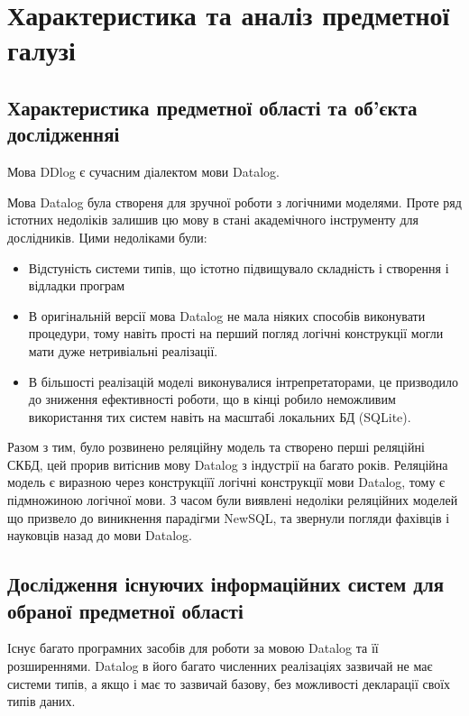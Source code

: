 \chapter{Характеристика та аналіз предметної галузі} 
\label{chap:first}

\section{Характеристика предметної області та об’єкта дослідженняі}

Мова DDlog є сучасним діалектом мови Datalog.

Мова Datalog була створеня для зручної роботи з логічними моделями. Проте ряд істотних недоліків залишив цю мову в стані академічного інструменту для дослідників. Цими недоліками були:
\begin{itemize}

\item Відстуність системи типів, що істотно підвищувало складність і створення і відладки програм

\item В оригінальній версії мова Datalog не мала ніяких способів виконувати процедури, тому навіть прості на перший погляд логічні конструкції могли мати дуже нетривіальні реалізації.

\item В більшості реалізацій моделі виконувалися інтрепретаторами, це призводило до зниження ефективності роботи, що в кінці робило неможливим використання тих систем навіть на масштабі локальних БД (SQLite).

\end{itemize}

Разом з тим, було розвинено реляційну модель та створено перші реляційні СКБД, цей прорив витіснив мову Datalog з індустрії на багато років. Реляційна модель є виразною  через конструкціїї логічні конструкції мови Datalog, тому є підмножиною логічної мови. З часом були виявлені недоліки реляційних моделей що призвело до виникнення парадігми NewSQL, та звернули погляди фахівців і науковців назад до мови Datalog.

\section{Дослідження існуючих інформаційних систем для обраної предметної області}

Існує багато програмних засобів для роботи за мовою Datalog та її розширеннями. Datalog в його багато численних реалізаціях зазвичай не має системи типів, а якщо і має то зазвичай базову, без можливості декларації своїх типів даних.

